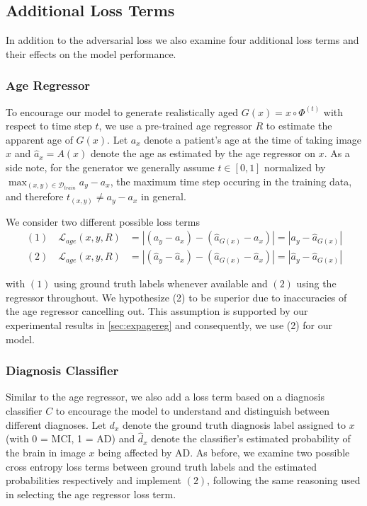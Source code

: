 \subsection{Additional Loss Terms}
In addition to the adversarial loss we also examine four additional loss terms and their effects on the model performance.

\subsubsection*{Age Regressor} \label{sec:adaagereg}
To encourage our model to generate realistically aged $G(x) = x \circ \Phi^{(t)} $ with respect to time step $t$, we use a pre-trained age regressor $R$ to estimate the apparent age of $G(x)$.
Let $ a_x $ denote a patient's age at the time of taking image $x$ and $ \hat a_x = A(x)$ denote the age as estimated by the age regressor on $x$. As a side note, for the generator we generally assume $t \in [0, 1]$ normalized by $\max_{(x, y) \in \mathcal{D}_{train}} a_y - a_x $, the maximum time step occuring in the training data, and therefore $t_{(x, y)} \neq a_y - a_x$ in general.

We consider two different possible loss terms 
\begin{equation}
	\begin{split}
		(1) \quad \mathcal{L}_{age}(x, y, R) & = 
		| (a_y - a_x) - (\hat a_{G(x)} - a_x) | =
		| a_y - \hat a_{G(x)} | \\[8pt]
		(2) \quad \mathcal{L}_{age}(x, y, R) & =
		| (\hat a_y - \hat a_x) - (\hat a_{G(x)} - \hat a_x) | = 
		| \hat a_y - \hat a_{G(x)} |
	\end{split}
\end{equation}

with $(1)$ using ground truth labels whenever available and $(2)$ using the regressor throughout. We hypothesize (2) to be superior due to inaccuracies of the age regressor cancelling out. This assumption is supported by our experimental results in \autoref{sec:expagereg} and consequently, we use (2) for our model.

\subsubsection*{Diagnosis Classifier}
Similar to the age regressor, we also add a loss term based on a diagnosis classifier $C$ to encourage the model to understand and distinguish between different diagnoses. Let $d_x$ denote the ground truth diagnosis label assigned to $x$ (with 0 = MCI, 1 = AD) and $\hat d_x$ denote the classifier's estimated probability of the brain in image $x$ being affected by AD. As before, we examine two possible cross entropy loss terms between ground truth labels and the estimated probabilities respectively and implement $(2)$, following the same reasoning used in selecting the age regressor loss term.

